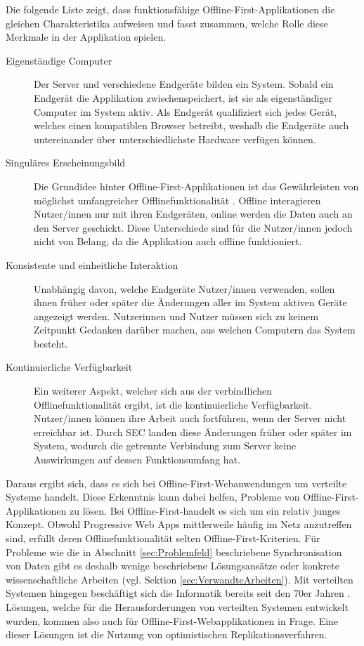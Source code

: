 \documentclass[a4paper, 12pt]{scrreprt}
\begin{document}
Die folgende Liste zeigt, dass funktionsfähige Offline-First-Applikationen die gleichen Charakteristika aufweisen und fasst zusammen, welche Rolle diese Merkmale in der Applikation spielen.

\begin{description}		
\item[Eigenständige Computer] Der Server und verschiedene Endgeräte bilden ein System. Sobald ein Endgerät die Applikation zwischenspeichert, ist sie als eigenständiger Computer im System aktiv. Als Endgerät qualifiziert sich jedes Gerät, welches einen kompatiblen Browser betreibt, weshalb die Endgeräte auch untereinander über unterschiedlichste Hardware verfügen können.
\item[Singuläres Erscheinungsbild]Die Grundidee hinter Offline-First-Applikationen ist das Gewährleisten von möglichst umfangreicher Offlinefunktionalität \autocite{OnlineGoogleOfflineFirst}. Offline interagieren Nutzer/innen nur mit ihren Endgeräten, online werden die Daten auch an den Server geschickt. Diese Unterschiede sind für die Nutzer/innen jedoch nicht von Belang, da die Applikation auch offline funktioniert. \item[Konsistente und einheitliche Interaktion]
Unabhängig davon, welche Endgeräte Nutzer/innen verwenden, sollen ihnen früher oder später die Änderungen aller im System aktiven Geräte angezeigt werden. Nutzerinnen und Nutzer müssen sich zu keinem Zeitpunkt Gedanken darüber machen, aus welchen Computern das System besteht.
\item[Kontinuierliche Verfügbarkeit]
Ein weiterer Aspekt, welcher sich aus der verbindlichen Offlinefunktionalität ergibt, ist die kontinuierliche Verfügbarkeit. Nutzer/innen können ihre Arbeit auch fortführen, wenn der Server nicht erreichbar ist. Durch SEC landen diese Änderungen früher oder später im System, wodurch die getrennte Verbindung zum Server keine Auswirkungen auf dessen Funktionsumfang hat. 
\end{description}
\label{tab:charakteristikaOfflineFirst}

Daraus ergibt sich, dass es sich bei Offline-First-Webanwendungen um verteilte Systeme handelt. Diese Erkenntnis kann dabei helfen, Probleme von Offline-First-Applikationen zu lösen. Bei Offline-First-handelt es sich um ein relativ junges Konzept. Obwohl Progressive Web Apps mittlerweile häufig im Netz anzutreffen sind, erfüllt deren Offlinefunktionalität selten Offline-First-Kriterien. Für Probleme wie die in Abschnitt \ref{sec:Problemfeld} beschriebene Synchronisation von Daten gibt es deshalb wenige beschriebene Lösungsansätze oder konkrete wissenschaftliche Arbeiten (vgl. Sektion \ref{sec:VerwandteArbeiten}). Mit verteilten Systemen hingegen beschäftigt sich die Informatik bereits seit den 70er Jahren \autocite{Andrews1999FoundationsOM}. Lösungen, welche für die Herausforderungen von verteilten Systemen entwickelt wurden, kommen also auch für Offline-First-Webapplikationen in Frage. Eine dieser Lösungen ist die Nutzung von optimistischen Replikationsverfahren. 
\end{document}
